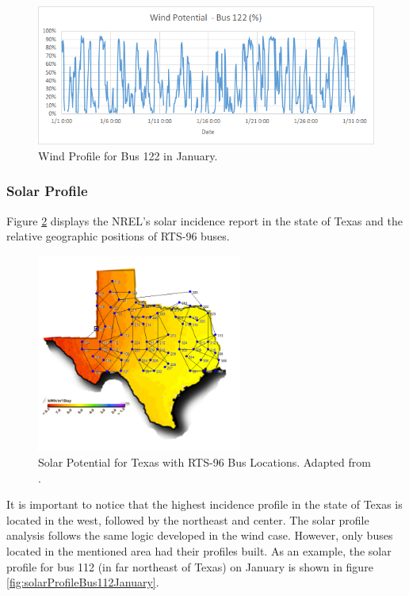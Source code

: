 \documentclass[12pt,LUDisStyle,twosided]{book}
\begin{document}
\begin{figure}[H] 
  \includegraphics[width=\textwidth,keepaspectratio]{windPotentialBus122.png}
  \caption{Wind Profile for Bus 122 in January.}
  \label{fig:windProfileBus122January}
\end{figure}

\newpage
\subsubsection{Solar Profile}

Figure \ref{fig:texasSolarProfile} displays the NREL's solar incidence report in the state of Texas and the relative geographic positions of RTS-96 buses. 

\begin{figure}[H] 
	\begin{center}
		\includegraphics[width=0.6\textwidth,height=\textheight,keepaspectratio]{texasSolarProfileWithBuses.png}
	  	\caption{Solar Potential for Texas with RTS-96 Bus Locations. Adapted from \cite{texasSolarProfile}. }	  		\label{fig:texasSolarProfile}
	\end{center}
\end{figure}


It is important to notice that the highest incidence profile in the state of Texas is located in the west, followed by the northeast and center. The solar profile analysis follows the same logic developed in the wind case. However, only buses located in the mentioned area had their profiles built. As an example, the solar profile for bus 112 (in far northeast of Texas) on January is shown in figure \ref{fig:solarProfileBus112January}.
\end{document}
